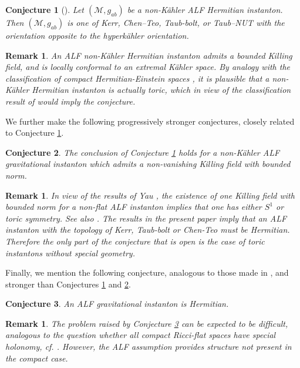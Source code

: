 \documentclass[a4paper,10pt,reqno]{amsart}
\newcommand{\cM}{\mathcal{M}}
\theoremstyle{plain}
\newtheorem{conj}{Conjecture}
\newtheorem{remark}[thm]{Remark}
\numberwithin{equation}{section}
\begin{document}
\begin{conj}[] \label{conj:Herm-class} Let $(\cM, g_{ab})$ be a non-K\"ahler ALF  Hermitian instanton. Then $(\cM, g_{ab})$ is one of Kerr, Chen--Teo, Taub-bolt, or Taub--NUT with the orientation opposite to the hyperk\"ahler orientation. 
\end{conj} 
\begin{remark} 
An ALF 
%
non-K\"ahler Hermitian instanton admits a bounded Killing field, and is locally conformal to an extremal K\"ahler space. By analogy with the classification of compact Hermitian-Einstein spaces \cite{MR2899877},  it is plausible that a non-K\"ahler Hermitian instanton is actually toric, which in view of the classification result of \cite{Biquard:Gauduchon} would imply the conjecture.  
\end{remark} 
We further make the following progressively stronger conjectures, closely related to Conjecture \ref{conj:Herm-class}. 
\begin{conj} \label{conj:KVF-class} The conclusion of Conjecture \ref{conj:Herm-class} holds for a non-K\"ahler ALF gravitational instanton which 
admits a non-vanishing Killing field with bounded norm.  
%
\end{conj}
\begin{remark} 
In view of the results of  Yau \cite{MR448379}, the existence of one Killing field with bounded norm for a non-flat ALF instanton implies that one has either  $S^1$ or toric symmetry. See also \cite[\S 2]{gibbons:hawking:1979}. The results in the present paper imply that an ALF instanton with the topology of Kerr, Taub-bolt or Chen-Teo must be Hermitian. Therefore the only part of the conjecture that is open is the case of toric instantons without special geometry. 
\end{remark}

Finally, we mention the following conjecture, analogous to those made in \cite{gibbons:1978:survey}, and stronger than Conjectures \ref{conj:Herm-class} and \ref{conj:KVF-class}. 
\begin{conj} \label{conj:strong-class}  
An ALF gravitational instanton is Hermitian. 
\end{conj} 
\begin{remark}  
The problem raised by Conjecture \ref{conj:strong-class} can be expected to be difficult, analogous to the question whether all compact Ricci-flat spaces have special holonomy, cf. \cite[p. 19]{MR2371700}. However, the ALF assumption provides structure not present in the compact case.  
\end{remark} 
\end{document}
